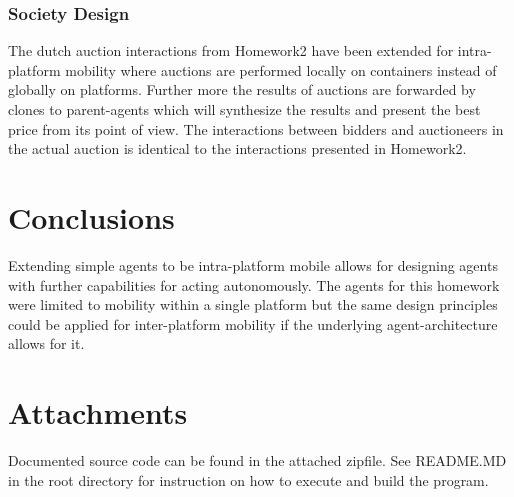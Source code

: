\documentclass[a4paper, 11pt]{article}
\begin{document}
\subsubsection*{Society Design}
The dutch auction interactions from Homework2 have been extended for intra-platform mobility where auctions are performed locally on containers instead of globally on platforms. Further more the results of auctions are forwarded by clones to parent-agents which will synthesize the results and present the best price from its point of view. The interactions between bidders and auctioneers in the actual auction is identical to the interactions presented in Homework2.
\section*{Conclusions}
Extending simple agents to be intra-platform mobile allows for designing agents with further capabilities for acting autonomously. The agents for this homework were limited to mobility within a single platform but the same design principles could be applied for inter-platform mobility if the underlying agent-architecture allows for it.

\section*{Attachments}
Documented source code can be found in the attached zipfile. See README.MD in the root directory for instruction on how to execute and build the program.

{}

\end{document}
